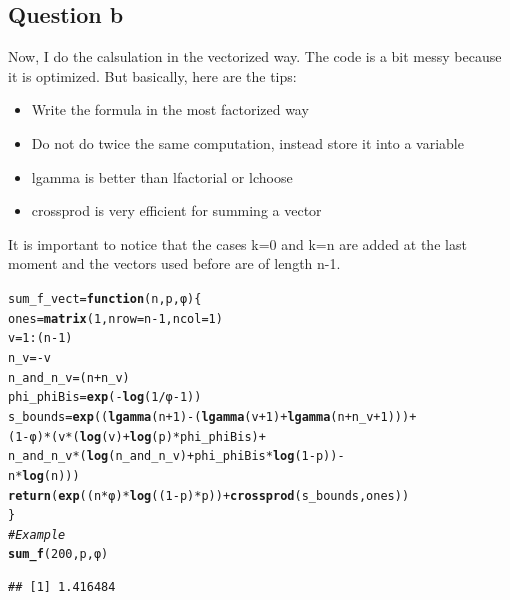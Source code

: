 \documentclass{llncs}\usepackage[]{graphicx}\usepackage[]{color}
\makeatletter
\newcommand{\hlnum}[1]{\textcolor[rgb]{0.686,0.059,0.569}{#1}}%
\newcommand{\hlcom}[1]{\textcolor[rgb]{0.678,0.584,0.686}{\textit{#1}}}%
\newcommand{\hlopt}[1]{\textcolor[rgb]{0,0,0}{#1}}%
\newcommand{\hlstd}[1]{\textcolor[rgb]{0.345,0.345,0.345}{#1}}%
\newcommand{\hlkwa}[1]{\textcolor[rgb]{0.161,0.373,0.58}{\textbf{#1}}}%
\newcommand{\hlkwb}[1]{\textcolor[rgb]{0.69,0.353,0.396}{#1}}%
\newcommand{\hlkwc}[1]{\textcolor[rgb]{0.333,0.667,0.333}{#1}}%
\newcommand{\hlkwd}[1]{\textcolor[rgb]{0.737,0.353,0.396}{\textbf{#1}}}%
\newenvironment{kframe}{%
 \def\at@end@of@kframe{}%
 \ifinner\ifhmode%
  \def\at@end@of@kframe{\end{minipage}}%
  \begin{minipage}{\columnwidth}%
 \fi\fi%
 \def\FrameCommand##1{\hskip\@totalleftmargin \hskip-\fboxsep
 \colorbox{shadecolor}{##1}\hskip-\fboxsep
     \hskip-\linewidth \hskip-\@totalleftmargin \hskip\columnwidth}%
 \MakeFramed {\advance\hsize-\width
   \@totalleftmargin\z@ \linewidth\hsize
   \@setminipage}}%
 {\par\unskip\endMakeFramed%
 \at@end@of@kframe}
\newenvironment{knitrout}{}{} %
\makeatother
\begin{document}
\subsection{Question b}
Now, I do the calsulation in the vectorized way. The code is a bit messy because it is optimized. But basically, here are the tips:
\begin{itemize}
\item Write the formula in the most factorized way
\item Do not do twice the same computation, instead store it into a variable
\item lgamma is better than lfactorial or lchoose
\item crossprod is very efficient for summing a vector
\end{itemize}
It is important to notice that the cases k=0 and k=n are added at the last moment and the vectors used before are of length n-1.
\begin{knitrout}
\color{fgcolor}\begin{kframe}
\begin{alltt}
\hlstd{sum_f_vect} \hlkwb{=} \hlkwa{function}\hlstd{(}\hlkwc{n}\hlstd{,}\hlkwc{p}\hlstd{,}\hlkwc{φ}\hlstd{)\{}
  \hlstd{ones}\hlkwb{=}\hlkwd{matrix}\hlstd{(}\hlnum{1}\hlstd{,}\hlkwc{nrow}\hlstd{=n}\hlopt{-}\hlnum{1}\hlstd{,}\hlkwc{ncol}\hlstd{=}\hlnum{1}\hlstd{)}
  \hlstd{v}\hlkwb{=}\hlnum{1}\hlopt{:}\hlstd{(n}\hlopt{-}\hlnum{1}\hlstd{)}
  \hlstd{n_v}\hlkwb{=} \hlopt{-}\hlstd{v}
  \hlstd{n_and_n_v}\hlkwb{=}\hlstd{(n}\hlopt{+}\hlstd{n_v)}
  \hlstd{phi_phiBis}\hlkwb{=}\hlkwd{exp}\hlstd{(}\hlopt{-}\hlkwd{log}\hlstd{(}\hlnum{1}\hlopt{/}\hlstd{φ}\hlopt{-}\hlnum{1}\hlstd{))}
  \hlstd{s_bounds} \hlkwb{=} \hlkwd{exp}\hlstd{((}\hlkwd{lgamma}\hlstd{(n}\hlopt{+}\hlnum{1}\hlstd{)}\hlopt{-}\hlstd{(}\hlkwd{lgamma}\hlstd{(v}\hlopt{+}\hlnum{1}\hlstd{)}\hlopt{+}\hlkwd{lgamma}\hlstd{(n}\hlopt{+}\hlstd{n_v}\hlopt{+}\hlnum{1}\hlstd{)))}\hlopt{+}
                   \hlstd{(}\hlnum{1}\hlopt{-}\hlstd{φ)}\hlopt{*}\hlstd{(v}\hlopt{*}\hlstd{(}\hlkwd{log}\hlstd{(v)}\hlopt{+}\hlkwd{log}\hlstd{(p)}\hlopt{*}\hlstd{phi_phiBis)} \hlopt{+}
                   \hlstd{n_and_n_v}\hlopt{*}\hlstd{(}\hlkwd{log}\hlstd{(n_and_n_v)}\hlopt{+}\hlstd{phi_phiBis}\hlopt{*}\hlkwd{log}\hlstd{(}\hlnum{1}\hlopt{-}\hlstd{p))} \hlopt{-}
                   \hlstd{n}\hlopt{*}\hlkwd{log}\hlstd{(n)))}
  \hlkwd{return}\hlstd{(} \hlkwd{exp}\hlstd{((n}\hlopt{*}\hlstd{φ)}\hlopt{*}\hlkwd{log}\hlstd{((}\hlnum{1}\hlopt{-}\hlstd{p)}\hlopt{*}\hlstd{p))}\hlopt{+}\hlkwd{crossprod}\hlstd{(s_bounds,ones))}
\hlstd{\}}
\hlcom{# Example}
\hlkwd{sum_f}\hlstd{(}\hlnum{200}\hlstd{,p,φ)}
\end{alltt}
\begin{lstlisting}[basicstyle=\ttfamily,breaklines=true]
## [1] 1.416484
\end{lstlisting}
\end{kframe}
\end{knitrout}
\end{document}
